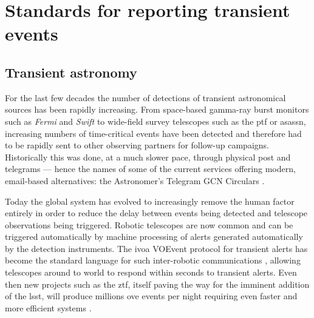 \section{Standards for reporting transient events}
\label{sec:alert_standards}
\begin{colsection}


\begin{colsection}


\end{colsection}


\subsection{Transient astronomy}
\label{sec:transient_astronomy}
\begin{colsection}


For the last few decades the number of detections of transient astronomical sources has been rapidly increasing. From space-based gamma-ray burst monitors such as \textit{Fermi} and \textit{Swift} to wide-field survey telescopes such as the \gls{ptf} or \gls{asassn}, increasing numbers of time-critical events have been detected and therefore had to be rapidly sent to other observing partners for follow-up campaigns. Historically this was done, at a much slower pace, through physical post and telegrams --- hence the names of some of the current services offering modern, email-based alternatives: the Astronomer's Telegram \citep{ATel} GCN Circulars \citep{GCN}.

Today the global system has evolved to increasingly remove the human factor entirely in order to reduce the delay between events being detected and telescope observations being triggered. Robotic telescopes are now common and can be triggered automatically by machine processing of alerts generated automatically by the detection instruments. The \gls{ivoa} VOEvent protocol for transient alerts has become the standard language for such inter-robotic communications \citep{voevent}, allowing telescopes around to world to respond within seconds to transient alerts. Even then new projects such as the \gls{ztf}, itself paving the way for the imminent addition of the \gls{lsst}, will produce millions ove events per night requiring even faster and more efficient systems \citep{ZTF_alerts}.


\end{colsection}
\end{colsection}
